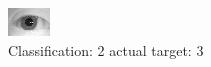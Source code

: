 \begin{figure}[h!]
\begin{center}
\includegraphics[width=0.60\columnwidth]{figures/ID1121_class_2_target_3.png}
\end{center}
\caption{ Classification: 2 actual target: 3}
\label{fig:ID1121_class_2_target_3}
\end{figure}
